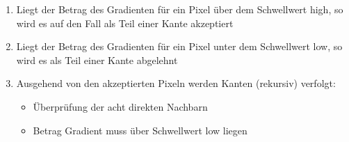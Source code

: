 \documentclass[paper=a4, fontsize=11pt]{scrartcl} %
\numberwithin{equation}{section} %
\numberwithin{figure}{section} %
\numberwithin{table}{section} %
\begin{document}
\begin{itemize}
\begin{enumerate}
\begin{enumerate}
\item Liegt der Betrag des Gradienten für ein Pixel über dem Schwellwert high, so wird es auf den Fall als Teil einer Kante akzeptiert
\item Liegt der Betrag des Gradienten für ein Pixel unter dem Schwellwert low, so wird es als Teil einer Kante abgelehnt
\item Ausgehend von den akzeptierten Pixeln werden Kanten (rekursiv) verfolgt:
\begin{itemize}
\item Überprüfung der acht direkten Nachbarn
\item Betrag Gradient muss über Schwellwert low liegen
\end{itemize}
\end{enumerate}
\end{enumerate}
\end{itemize}
\end{document}
